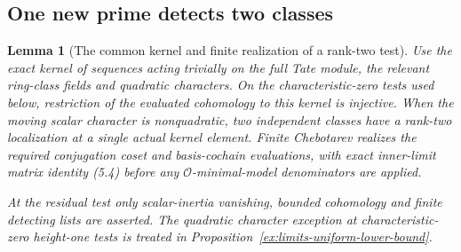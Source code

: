 \documentclass[11pt]{article}
\newtheorem{lemma}[theorem]{Lemma}
\theoremstyle{definition}
\theoremstyle{remark}
\providecommand{\mathscr}[1]{\mathcal{#1}}
\begin{document}
\subsection{One new prime detects two classes}
\begin{lemma}[The common kernel and finite realization of a rank-two test]\label{ex:limits-kernel-detection}
Use the exact kernel of sequences acting trivially on the full
Tate module, the relevant ring-class fields and quadratic
characters. On the characteristic-zero tests used below,
restriction of the evaluated cohomology to this kernel is injective.
When the moving scalar character is nonquadratic, two independent
classes have a rank-two localization at a single actual kernel
element. Finite Chebotarev realizes the required conjugation
coset and basis-cochain evaluations, with exact inner-limit
matrix identity (5.4) before any $\mathscr O$-minimal-model
denominators are applied.

At the residual test only scalar-inertia vanishing, bounded
cohomology and finite detecting lists are asserted. The quadratic
character exception at characteristic-zero height-one tests is
treated in Proposition~\ref{ex:limits-uniform-lower-bound}.
\end{lemma}
\end{document}
